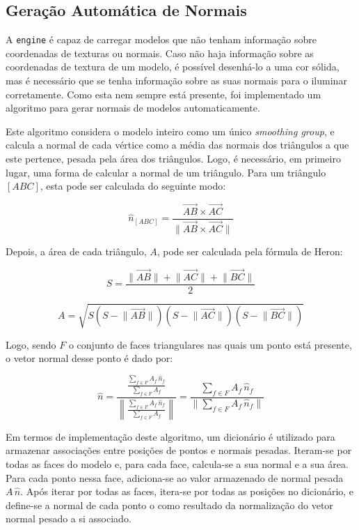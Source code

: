 \documentclass[12pt, a4paper]{article}
\begin{document}
\subsection{Geração Automática de Normais}

A \texttt{engine} é capaz de carregar modelos que não tenham informação sobre coordenadas de
texturas ou normais. Caso não haja informação sobre as coordenadas de textura de um modelo, é
possível desenhá-lo a uma cor sólida, mas é necessário que se tenha informação sobre as suas normais
para o iluminar corretamente. Como esta nem sempre está presente, foi implementado um algoritmo para
gerar normais de modelos automaticamente.

Este algoritmo considera o modelo inteiro como um único \emph{smoothing group}, e calcula a normal
de cada vértice como a média das normais dos triângulos a que este pertence, pesada pela área dos
triângulos. Logo, é necessário, em primeiro lugar, uma forma de calcular a normal de um triângulo.
Para um triângulo $[ABC]$, esta pode ser calculada do seguinte modo:

$$
\hat{n}_{[ABC]} = \frac{
    \overrightarrow{AB} \times \overrightarrow{AC}
}{
    \lVert \overrightarrow{AB} \times \overrightarrow{AC} \rVert
}
$$

Depois, a área de cada triângulo, $A$, pode ser calculada pela fórmula de Heron:

$$
S = \frac{
    \lVert \overrightarrow{AB} \rVert +
    \lVert \overrightarrow{AC} \rVert +
    \lVert \overrightarrow{BC} \rVert
}{
    2
}
$$

$$
A = \sqrt{
    S
    \left ( S - \lVert \overrightarrow{AB} \rVert \right )
    \left ( S - \lVert \overrightarrow{AC} \rVert \right )
    \left ( S - \lVert \overrightarrow{BC} \rVert \right )
}
$$

Logo, sendo $F$ o conjunto de faces triangulares nas quais um ponto está presente, o vetor normal
desse ponto é dado por:

$$
\hat{n} =
\frac{
    \frac{
        \sum_{f \in F} {A_f \, \hat{n}_f}
    }{
        \sum_{f \in F} {A_f}
    }
}{
    \left \lVert
    \frac{
        \sum_{f \in F} {A_f \, \hat{n}_f}
    }{
        \sum_{f \in F} {A_f}
    }
    \right \rVert
}
=
\frac{
    \sum_{f \in F} {A_f \, \hat{n}_f}
}{
    \lVert \sum_{f \in F} {A_f \, \hat{n}_f} \rVert
}
$$

Em termos de implementação deste algoritmo, um dicionário é utilizado para armazenar associações
entre posições de pontos e normais pesadas. Iteram-se por todas as faces do modelo e, para cada
face, calcula-se a sua normal e a sua área. Para cada ponto nessa face, adiciona-se ao valor
armazenado de normal pesada $A \, \hat{n}$. Após iterar por todas as faces, itera-se por todas as
posições no dicionário, e define-se a normal de cada ponto o como resultado da normalização do vetor
normal pesado a si associado.
\end{document}
